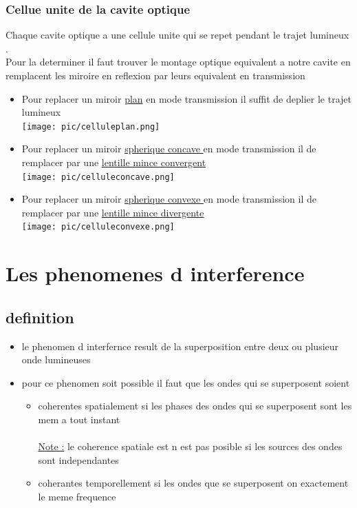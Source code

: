 \documentclass[12pt]{book}
\begin{document}
        \subsection{Cellue unite de la cavite optique}
        Chaque cavite optique a une cellule unite qui se repet pendant le trajet lumineux .\\
        Pour la determiner il faut trouver le montage optique equivalent a notre cavite en remplacent les miroire en reflexion par leurs equivalent en transmission
        \begin{itemize}
            \item Pour replacer un miroir \underline{plan} en mode transmission il suffit de deplier le trajet lumineux
               \\ \texttt{[image: pic/celluleplan.png]}
            \item Pour replacer un miroir \underline{spherique concave } en mode transmission il de remplacer par une \underline{lentille mince convergent}
              \\  \texttt{[image: pic/celluleconcave.png]}
            \item Pour replacer un miroir \underline{spherique convexe } en mode transmission il de remplacer par une \underline{lentille mince divergente}
               \\ \texttt{[image: pic/celluleconvexe.png]}
        \end{itemize}
    \chapter{Les phenomenes d interference}
        \section{definition}
            \begin{itemize}
                \item le phenomen d interfernce result de la superposition entre deux ou plusieur onde lumineuses
                \item pour ce phenomen soit possible il faut que les ondes qui se superposent soient
                    \begin{itemize}
                        \item coherentes spatialement
                            si les phases des ondes qui se superposent sont les mem a tout instant \\
                            \\ \underline{Note :} le coherence spatiale est n est pas posible si les sources des ondes sont independantes
                        \item coherantes temporellement
                            si les ondes que se superposent on exactement le meme frequence
                \end{itemize}
            \end{itemize}
\end{document}
